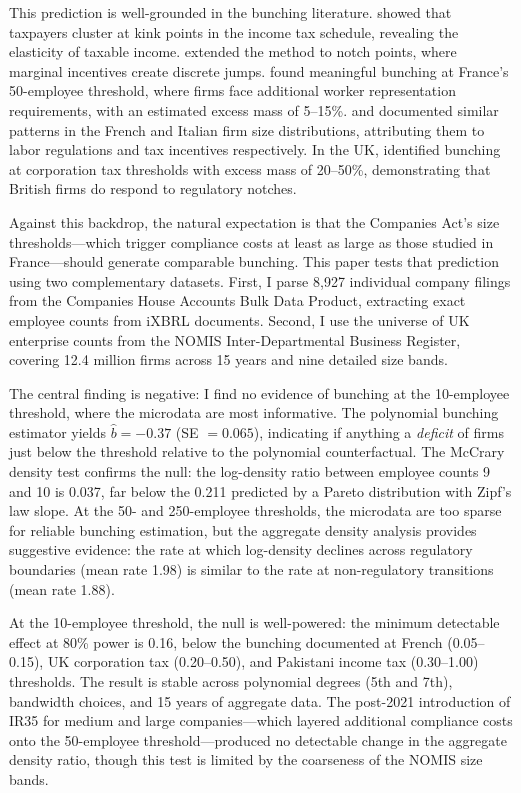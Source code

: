 \documentclass[12pt]{article}
\begin{document}
This prediction is well-grounded in the bunching literature. \citet{chetty2011} showed that taxpayers cluster at kink points in the income tax schedule, revealing the elasticity of taxable income. \citet{kleven2013} extended the method to notch points, where marginal incentives create discrete jumps. \citet{garicano2016} found meaningful bunching at France's 50-employee threshold, where firms face additional worker representation requirements, with an estimated excess mass of 5--15\%. \citet{gourio2014} and \citet{schivardi2011} documented similar patterns in the French and Italian firm size distributions, attributing them to labor regulations and tax incentives respectively. In the UK, \citet{devereux2014} identified bunching at corporation tax thresholds with excess mass of 20--50\%, demonstrating that British firms do respond to regulatory notches.

Against this backdrop, the natural expectation is that the Companies Act's size thresholds---which trigger compliance costs at least as large as those studied in France---should generate comparable bunching. This paper tests that prediction using two complementary datasets. First, I parse 8,927 individual company filings from the Companies House Accounts Bulk Data Product, extracting exact employee counts from iXBRL documents. Second, I use the universe of UK enterprise counts from the NOMIS Inter-Departmental Business Register, covering 12.4 million firms across 15 years and nine detailed size bands.

The central finding is negative: I find no evidence of bunching at the 10-employee threshold, where the microdata are most informative. The polynomial bunching estimator yields $\hat{b} = -0.37$ (SE $= 0.065$), indicating if anything a \textit{deficit} of firms just below the threshold relative to the polynomial counterfactual. The McCrary density test confirms the null: the log-density ratio between employee counts 9 and 10 is 0.037, far below the 0.211 predicted by a Pareto distribution with Zipf's law slope. At the 50- and 250-employee thresholds, the microdata are too sparse for reliable bunching estimation, but the aggregate density analysis provides suggestive evidence: the rate at which log-density declines across regulatory boundaries (mean rate 1.98) is similar to the rate at non-regulatory transitions (mean rate 1.88).

At the 10-employee threshold, the null is well-powered: the minimum detectable effect at 80\% power is 0.16, below the bunching documented at French (0.05--0.15), UK corporation tax (0.20--0.50), and Pakistani income tax (0.30--1.00) thresholds. The result is stable across polynomial degrees (5th and 7th), bandwidth choices, and 15 years of aggregate data. The post-2021 introduction of IR35 for medium and large companies---which layered additional compliance costs onto the 50-employee threshold---produced no detectable change in the aggregate density ratio, though this test is limited by the coarseness of the NOMIS size bands.
\end{document}
